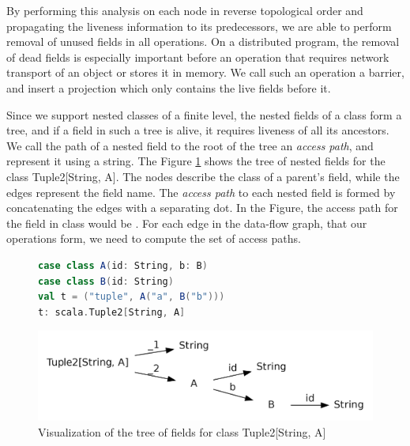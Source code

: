 By performing this analysis on each node in reverse topological order and
propagating the liveness information to its predecessors, we are able to perform
removal of unused fields in all operations. On a distributed program, the
removal of dead fields is especially important before an operation that requires
network transport of an object or stores it in memory. We call such an operation
a barrier, and insert a projection which only contains the live fields before
it.

Since we support nested classes of a finite level, the nested fields of a class
form a tree, and if a field in such a tree is alive, it requires liveness of all
its ancestors. We call the path of a nested field to the root of the tree an
\emph{access path}, and represent it using a string. The Figure
\ref{fig:type_tree} shows the tree of nested fields for the class Tuple2[String,
A]. The nodes describe the class of a parent's field, while the edges represent
the field name. The \emph{access path} to each nested field is formed by
concatenating the edges with a separating dot. In the Figure, the access path
for the field  in class  would be . For each edge
in the data-flow graph, that our operations form, we need to compute the set of
access paths.

\begin{figure}[b]
\begin{lstlisting}[language=Scala,name=code]
case class A(id: String, b: B)
case class B(id: String)  
val t = ("tuple", A("a", B("b"))) 
t: scala.Tuple2[String, A]
\end{lstlisting}
\centering
\includegraphics[clip=true, width=0.95\columnwidth]{dot/access.png}
\caption{Visualization of the tree of fields for class Tuple2[String, A]}
\label{fig:type_tree}
\end{figure}

